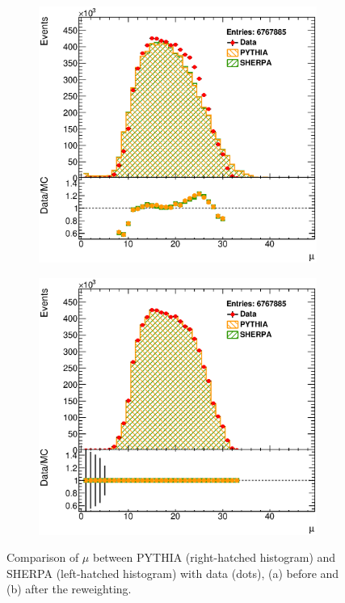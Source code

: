 \documentclass[12pt, twoside]{article}
\numberwithin{equation}{section}
\numberwithin{figure}{section}
\begin{document}
\begin{figure}[h]
    \centering
    \begin{subfigure}[b]{0.4\textwidth}
        \includegraphics[width=\textwidth]{./images/Results(Default)/MU.eps}
        \subcaption{}
        \label{fig:DefaultMU}
    \end{subfigure}
    \hspace{1.0cm}
    \begin{subfigure}[b]{0.4\textwidth}
        \includegraphics[width=\textwidth]{./images/Results(MUReweight)/MU.eps}
        \subcaption{}
        \label{fig:MUReweightMU}
    \end{subfigure}

    \vspace{0.5cm}
    \captionsetup{width=0.9\textwidth}
    \caption{Comparison of $\mu$ between PYTHIA (right-hatched histogram) and SHERPA (left-hatched histogram) with data (dots), (a) before and (b) after the reweighting.}
    \label{fig:MUReweight}
\end{figure}
\end{document}
